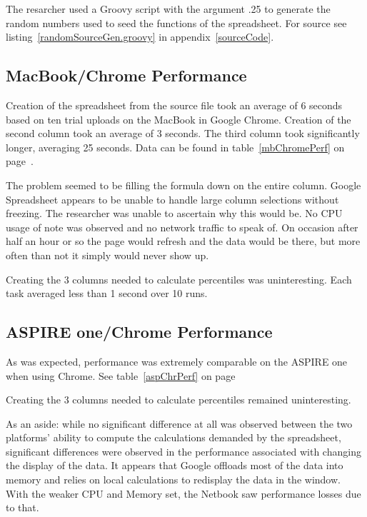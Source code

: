 The resarcher used a Groovy script with the argument .25 to generate the random
numbers used to seed the functions of the spreadsheet.  For source
see listing~\ref{randomSourceGen.groovy} in appendix~\ref{sourceCode}.

\subsection{MacBook/Chrome Performance}

Creation of the spreadsheet from the source file took an average of 6 seconds
based on ten trial uploads on the MacBook in Google Chrome. Creation of the
second column took an average of 3 seconds. The third column took significantly
longer, averaging 25 seconds. Data can be found in table~\ref{mbChromePerf} on
page~\pageref{mbChromePerf}.



The problem seemed to be filling the formula down on the entire column.  Google
Spreadsheet appears to be unable to handle large column selections without
freezing.  The researcher was unable to ascertain why this would be.  No CPU
usage of note was observed and no network traffic to speak of.  On occasion
after half an hour or so the page would refresh and the data would be there, but
more often than not it simply would never show up.

Creating the 3 columns needed to calculate percentiles was uninteresting.  Each
task averaged less than 1 second over 10 runs.

\subsection{ASPIRE one/Chrome Performance}

As was expected, performance was extremely comparable on the ASPIRE one when
using Chrome. See table~\ref{aspChrPerf} on page~\pageref{aspChrPerf}



Creating the 3 columns needed to calculate percentiles remained uninteresting.

As an aside: while no significant difference at all was observed between the
two platforms' ability to compute the calculations demanded by the spreadsheet,
significant differences were observed in the performance associated with
changing the display of the data.  It appears that Google offloads most of the
data into memory and relies on local calculations to redisplay the data in the
window.  With the weaker CPU and Memory set, the Netbook saw performance losses
due to that.

